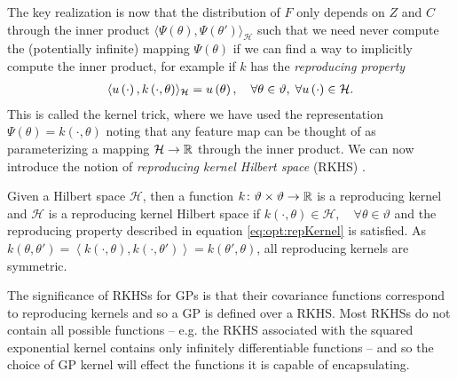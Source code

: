 The key realization is now that the distribution of $F$ only depends on $Z$ and $C$ through the inner product
$\langle\Psi\left(\theta\right), \Psi\left(\theta'\right)\rangle_{\mathcal{H}}$ such that we need never compute 
the (potentially infinite) mapping $\Psi\left(\theta\right)$ if we can find a way to implicitly compute the inner product, 
for example if $k$ has the \emph{reproducing property}
\begin{align}
\label{eq:opt:repKernel}
\langle u \left(\cdot\right), k\left(\cdot,\theta\right)\rangle_{\mathcal{H}} = u\left(\theta\right), \quad \forall \theta \in \vartheta, \; \forall u\left(\cdot\right) \in \mathcal{H}.
\end{align}
This is called the kernel trick, where we have used the representation $\Psi\left(\theta\right) = k\left(\cdot,\theta\right)$ noting that any feature map can be thought of as parameterizing a mapping $\mathcal{H} \rightarrow \mathbb{R}$ through the inner product.
We can now introduce the notion of \emph{reproducing kernel Hilbert space} (RKHS) \citep{aronszajn1950theory}.
\begin{definition}{}
	\label{def:opt:RKHS}
	Given a Hilbert space $\mathcal{H}$, then a function $k \colon \vartheta \times \vartheta \rightarrow \mathbb{R}$ is a reproducing
	kernel and  $\mathcal{H}$ is a reproducing kernel Hilbert space if
	$k\left(\cdot,\theta\right) \in \mathcal{H}, \quad \forall \theta \in \vartheta$ and the reproducing property described in equation \eqref{eq:opt:repKernel} is satisfied.
	As $k\left(\theta,\theta'\right) = \left\langle k\left(\cdot,\theta\right), k\left(\cdot,\theta'\right)\right\rangle = k\left(\theta',\theta\right)$, all reproducing kernels are symmetric.
\end{definition}
\noindent The significance of RKHSs for GPs is that their covariance functions correspond to reproducing kernels and
so a GP is defined over a RKHS.  Most RKHSs do not contain all possible functions -- e.g. the RKHS associated
with the squared exponential kernel contains only infinitely differentiable functions -- and so the choice
of GP kernel will effect the functions it is capable of encapsulating.

